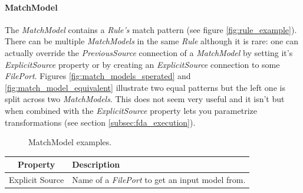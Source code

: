 \paragraph{MatchModel}

The \emph{MatchModel} contains a \emph{Rule's} match pattern (see figure
\ref{fig:rule_example}). There can be multiple \emph{MatchModels} in the same
\emph{Rule} although it is rare: one can actually override the
\emph{PreviousSource} connection of a \emph{MatchModel} by setting it's
\emph{ExplicitSource} property or by creating an \emph{ExplicitSource}
connection to some \emph{FilePort}. Figures \ref{fig:match_models_sperated} and
\ref{fig:match_model_equivalent} illustrate two equal patterns but the left one
is split across two \emph{MatchModels}. This does not seem very useful and
it isn't but when combined with the \emph{ExplicitSource} property lets you
parametrize transformations (see section \ref{subsec:fda_execution}).

\begin{figure}[h]
\begin{center}
  \caption{MatchModel examples.}
  \label{fig:match_models_examples}
\end{center}
\end{figure}

\begin{center}
  \begin{tabular}{ | c | p{\paragraphsize} | }
    \hline
    \textbf{Property} & \textbf{Description} \\ \hline
    Explicit Source & Name of a \emph{FilePort} to get an input model from.  \\ \hline
  \end{tabular}
\end{center}

